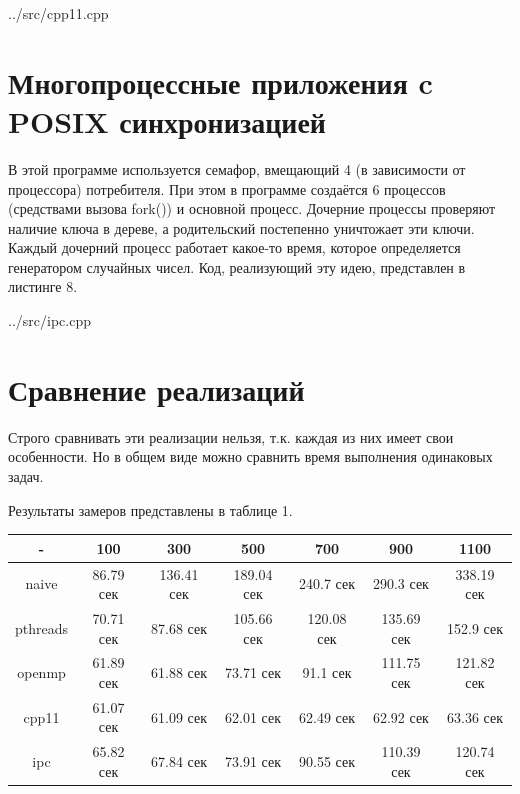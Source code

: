 \documentclass[a4paper, 12pt]{report}		%
\begin{document}

{../src/cpp11.cpp}


\chapter*{Многопроцессные приложения c POSIX синхронизацией}

В этой программе используется семафор, вмещающий 4 (в зависимости от процессора) потребителя. При этом в программе создаётся 6 процессов (средствами вызова fork()) и основной процесс. Дочерние процессы проверяют наличие ключа в дереве, а родительский постепенно уничтожает эти ключи. Каждый дочерний процесс работает какое-то время, которое определяется генератором случайных чисел. Код, реализующий эту идею, представлен в листинге 8.


{../src/ipc.cpp}



\chapter*{Сравнение реализаций}

Строго сравнивать эти реализации нельзя, т.к. каждая из них имеет свои особенности. Но в общем виде можно сравнить время выполнения одинаковых задач.

Результаты замеров представлены в таблице 1.

\begin{table}[!h]
\centering
\begin{tabular}{|c|c|c|c|c|c|c|}
\hline 
- & 100 & 300 & 500 & 700 & 900 & 1100 \\ 
\hline 
naive & 86.79 сек & 136.41 сек & 189.04 сек & 240.7 сек & 290.3 сек & 338.19 сек \\ 
\hline 
pthreads & 70.71 сек & 87.68 сек & 105.66 сек & 120.08 сек & 135.69 сек & 152.9 сек \\ 
\hline 
openmp & 61.89 сек & 61.88 сек & 73.71 сек & 91.1 сек & 111.75 сек & 121.82 сек \\ 
\hline 
cpp11 & 61.07 сек & 61.09 сек & 62.01 сек & 62.49 сек & 62.92 сек & 63.36 сек \\ 
\hline 
ipc & 65.82 сек & 67.84 сек & 73.91 сек & 90.55 сек & 110.39 сек & 120.74 сек \\ 
\hline 
\end{tabular} 
\end{table}
\end{document}
